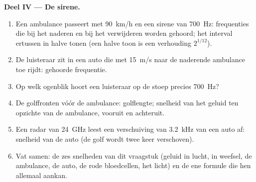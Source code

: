 \begin{problem}
\medskip
\noindent\textbf{Deel IV --- De sirene.}
\begin{enumerate}[resume]
  \item Een ambulance passeert met \qty{90}{km/h} en een sirene van
        \qty{700}{Hz}: frequenties die bij het naderen en bij het
        verwijderen worden gehoord; het interval ertussen in halve tonen
        (een halve toon is een verhouding $2^{1/12}$).
  \item De luisteraar zit in een auto die met \qty{15}{m/s} naar de
        naderende ambulance toe rijdt: gehoorde frequentie.
  \item Op welk ogenblik hoort een luisteraar op de stoep precies \qty{700}{Hz}?
  \item De golffronten vóór de ambulance: golflengte; snelheid van het
        geluid ten opzichte van de ambulance, vooruit en achteruit.
  \item Een radar van \qty{24}{GHz} leest een verschuiving van
        \qty{3.2}{kHz} van een auto af: snelheid van de auto (de golf wordt
        twee keer verschoven).
  \item Vat samen: de zes snelheden van dit vraagstuk (geluid in lucht, in
        weefsel, de ambulance, de auto, de rode bloedcellen, het licht) en
        de ene formule die hen allemaal aankan.
\end{enumerate}
\end{problem}

